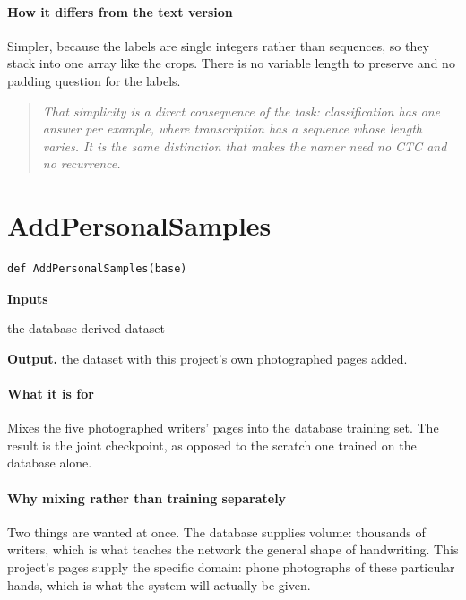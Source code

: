 \paragraph{How it differs from the text version}
Simpler, because the labels are single integers rather than sequences, so they stack into one array like the crops. There is no variable length to preserve and no padding question for the labels.


\begin{quote}\small\itshape That simplicity is a direct consequence of the task: classification has one answer per example, where transcription has a sequence whose length varies. It is the same distinction that makes the namer need no CTC and no recurrence.\end{quote}

\section{AddPersonalSamples}
\begin{lstlisting}[style=sig]
def AddPersonalSamples(base)
\end{lstlisting}

\noindent\textbf{Inputs}
\begin{description}[leftmargin=2.2em,style=nextline,font=\normalfont\ttfamily]\setlength\itemsep{1pt}
  \item[{base}] \normalfont the database-derived dataset
\end{description}

\noindent\textbf{Output.} the dataset with this project's own photographed pages added.


\paragraph{What it is for}
Mixes the five photographed writers' pages into the database training set. The result is the joint checkpoint, as opposed to the scratch one trained on the database alone.


\paragraph{Why mixing rather than training separately}
Two things are wanted at once. The database supplies volume: thousands of writers, which is what teaches the network the general shape of handwriting. This project's pages supply the specific domain: phone photographs of these particular hands, which is what the system will actually be given.

